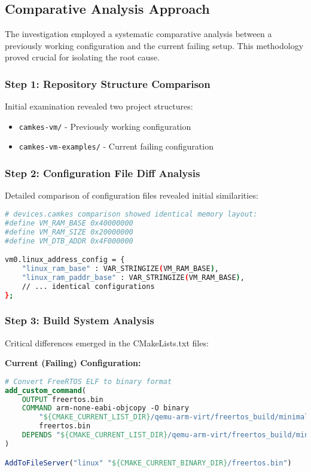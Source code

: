 \documentclass[11pt,a4paper]{article}
\begin{document}
\subsection{Comparative Analysis Approach}

The investigation employed a systematic comparative analysis between a previously working configuration and the current failing setup. This methodology proved crucial for isolating the root cause.

\subsubsection{Step 1: Repository Structure Comparison}

Initial examination revealed two project structures:
\begin{itemize}
\item \texttt{camkes-vm/} - Previously working configuration
\item \texttt{camkes-vm-examples/} - Current failing configuration
\end{itemize}

\subsubsection{Step 2: Configuration File Diff Analysis}

Detailed comparison of configuration files revealed initial similarities:

\begin{lstlisting}[language=bash, caption=Configuration Comparison]
# devices.camkes comparison showed identical memory layout:
#define VM_RAM_BASE 0x40000000
#define VM_RAM_SIZE 0x20000000
#define VM_DTB_ADDR 0x4F000000

vm0.linux_address_config = {
    "linux_ram_base" : VAR_STRINGIZE(VM_RAM_BASE),
    "linux_ram_paddr_base" : VAR_STRINGIZE(VM_RAM_BASE),
    // ... identical configurations
};
\end{lstlisting}

\subsubsection{Step 3: Build System Analysis}

Critical differences emerged in the CMakeLists.txt files:

\textbf{Current (Failing) Configuration:}
\begin{lstlisting}[language=cmake, caption=Binary Conversion Approach]
# Convert FreeRTOS ELF to binary format
add_custom_command(
    OUTPUT freertos.bin
    COMMAND arm-none-eabi-objcopy -O binary 
        "${CMAKE_CURRENT_LIST_DIR}/qemu-arm-virt/freertos_build/minimal_uart_virt.elf" 
        freertos.bin
    DEPENDS "${CMAKE_CURRENT_LIST_DIR}/qemu-arm-virt/freertos_build/minimal_uart_virt.elf"
)

AddToFileServer("linux" "${CMAKE_CURRENT_BINARY_DIR}/freertos.bin")
\end{lstlisting}
\end{document}
